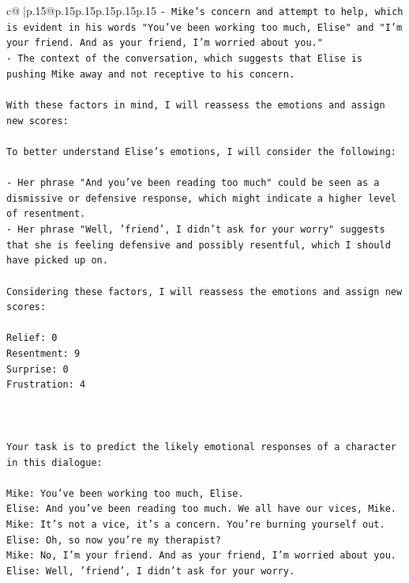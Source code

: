 \documentclass{article}
\begin{document}
{\begin{supertabular}{c@{$\;$}|p{.15\linewidth}@{}p{.15\linewidth}p{.15\linewidth}p{.15\linewidth}p{.15\linewidth}p{.15\linewidth}}
{{{\texttt{{-} Mike's concern and attempt to help, which is evident in his words "You've been working too much, Elise" and "I'm your friend. And as your friend, I'm worried about you."} \\
\texttt{{-} The context of the conversation, which suggests that Elise is pushing Mike away and not receptive to his concern.} \\
\\ 
\texttt{With these factors in mind, I will reassess the emotions and assign new scores:} \\
\\ 
\texttt{To better understand Elise's emotions, I will consider the following:} \\
\\ 
\texttt{{-} Her phrase "And you've been reading too much" could be seen as a dismissive or defensive response, which might indicate a higher level of resentment.} \\
\texttt{{-} Her phrase "Well, 'friend', I didn't ask for your worry" suggests that she is feeling defensive and possibly resentful, which I should have picked up on.} \\
\\ 
\texttt{Considering these factors, I will reassess the emotions and assign new scores:} \\
\\ 
\texttt{Relief: 0} \\
\texttt{Resentment: 9} \\
\texttt{Surprise: 0} \\
\texttt{Frustration: 4} \\
\\ 
\\ 
\\ 
\texttt{Your task is to predict the likely emotional responses of a character in this dialogue:} \\
\\ 
\texttt{Mike: You've been working too much, Elise.} \\
\texttt{Elise: And you've been reading too much. We all have our vices, Mike.} \\
\texttt{Mike: It's not a vice, it's a concern. You're burning yourself out.} \\
\texttt{Elise: Oh, so now you're my therapist? } \\
\texttt{Mike: No, I'm your friend. And as your friend, I'm worried about you.} \\
\texttt{Elise: Well, 'friend', I didn't ask for your worry.} \\
}}}
\end{supertabular}}
\end{document}
